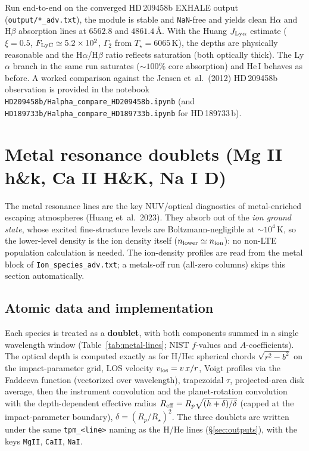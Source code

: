 \documentclass[english,a4paper]{my_memo}
\begin{document}
Run end-to-end on the converged HD\,209458b EXHALE output
(\texttt{output/*\_adv.txt}), the module is stable and \texttt{NaN}-free
and yields clean H$\alpha$ and H$\beta$ absorption lines at $6562.8$ and
$4861.4$\,\AA{}. With the Huang $J_{\rm Ly\alpha}$ estimate
($\xi=0.5$, $F_{\rm LyC}\simeq5.2\times10^{2}$, $\Gamma_2$ from
$T_\star=6065\,$K), the depths are physically reasonable and the
H$\alpha$/H$\beta$ ratio reflects saturation (both optically thick). The
Ly$\alpha$ branch in the same run saturates ($\sim100\%$ core absorption)
and He\,I behaves as before. A worked comparison against the
Jensen et~al.~(2012) HD\,209458b observation is provided in the notebook
\texttt{HD209458b/Halpha\_compare\_HD209458b.ipynb} (and
\texttt{HD189733b/Halpha\_compare\_HD189733b.ipynb} for HD\,189733\,b).

\section{Metal resonance doublets (Mg II h\&k, Ca II H\&K, Na I D)}
\label{sec:metals}

The metal resonance lines are the key NUV/optical diagnostics of
metal-enriched escaping atmospheres (Huang et~al.~2023). They absorb out
of the \emph{ion ground state}, whose excited fine-structure levels are
Boltzmann-negligible at $\sim10^4$\,K, so the lower-level density is the
ion density itself ($n_{\rm lower}\simeq n_{\rm ion}$): no non-LTE
population calculation is needed. The ion-density profiles are read from
the metal block of \texttt{Ion\_species\_adv.txt}; a metals-off run
(all-zero columns) skips this section automatically.

\subsection{Atomic data and implementation}

Each species is treated as a \textbf{doublet}, with both components
summed in a single wavelength window
(Table~\ref{tab:metal-lines}; NIST $f$-values and $A$-coefficients).
The optical depth is computed exactly as for H/He: spherical chords
$\sqrt{r^2-b^2}$ on the impact-parameter grid, LOS velocity
$v_{\rm los}=v\,x/r$, Voigt profiles via the Faddeeva function
(vectorized over wavelength), trapezoidal $\tau$, projected-area disk
average, then the instrument convolution and the planet-rotation
convolution with the depth-dependent effective radius
$R_{\rm eff}=R_p\sqrt{(h+\delta)/\delta}$ (capped at the
impact-parameter boundary), $\delta=(R_p/R_\star)^2$. The three doublets
are written under the same \texttt{tpm\_<line>} naming as the H/He lines
(\S\ref{sec:outputs}), with the keys \texttt{MgII}, \texttt{CaII},
\texttt{NaI}.
\end{document}
